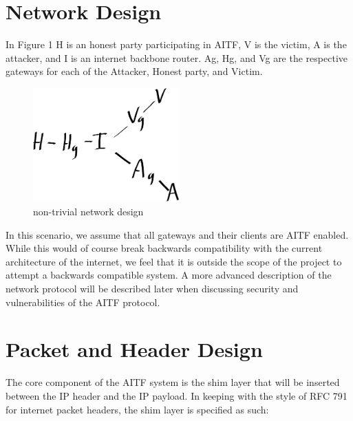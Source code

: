 \documentclass[11pt]{article}
\begin{document}
\section{Network Design}
In Figure 1 H is an honest party participating in AITF, V is the victim, A is
the attacker, and I is an internet backbone router. Ag, Hg, and Vg are the
respective gateways for each of the Attacker, Honest party, and Victim. 
\begin{figure}[h!]
 \caption{non-trivial network design}
 \centering
  \includegraphics[width=0.5\textwidth]{network}
\end{figure}
In this scenario, we assume that all gateways and their clients are AITF
enabled. While this would of course break backwards compatibility with the
current architecture of the internet, we feel that it is outside the scope of
the project to attempt a backwards compatible system. A more advanced
description of the network protocol will be described later when discussing
security and vulnerabilities of the AITF protocol.

\newpage

\section{Packet and Header Design}
The core component of the AITF system is the shim layer that will be inserted
between the IP header and the IP payload. In keeping with the style of RFC 791
for internet packet headers, the shim layer is specified as such:

\texttt{}
\end{document}
